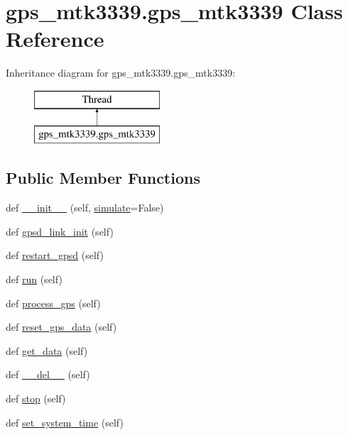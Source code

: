 \hypertarget{classgps__mtk3339_1_1gps__mtk3339}{}\section{gps\+\_\+mtk3339.\+gps\+\_\+mtk3339 Class Reference}
\label{classgps__mtk3339_1_1gps__mtk3339}
Inheritance diagram for gps\+\_\+mtk3339.\+gps\+\_\+mtk3339\+:\begin{figure}[H]
\begin{center}
\leavevmode
\includegraphics[height=2.000000cm]{classgps__mtk3339_1_1gps__mtk3339}
\end{center}
\end{figure}
\subsection*{Public Member Functions}
\begin{DoxyCompactItemize}
\item 
def \hyperlink{classgps__mtk3339_1_1gps__mtk3339_aef9ef03ebb7337c94b529d949fa494d4}{\+\_\+\+\_\+init\+\_\+\+\_\+} (self, \hyperlink{classgps__mtk3339_1_1gps__mtk3339_a0b660f851b889fd51697772bea5a2298}{simulate}=False)
\item 
def \hyperlink{classgps__mtk3339_1_1gps__mtk3339_a83e26207ff8028de5a6b07890e096ed0}{gpsd\+\_\+link\+\_\+init} (self)
\item 
def \hyperlink{classgps__mtk3339_1_1gps__mtk3339_a9866902bcd93e9087afc6b0a2a8eb579}{restart\+\_\+gpsd} (self)
\item 
def \hyperlink{classgps__mtk3339_1_1gps__mtk3339_a9d8c94a9453d19e4aa38d44b5b29d7a1}{run} (self)
\item 
def \hyperlink{classgps__mtk3339_1_1gps__mtk3339_a39164ba4a6f8f2456e2e6a0e8ce1cb43}{process\+\_\+gps} (self)
\item 
def \hyperlink{classgps__mtk3339_1_1gps__mtk3339_a5607ce090bf92bfae717d67b0052b5bd}{reset\+\_\+gps\+\_\+data} (self)
\item 
def \hyperlink{classgps__mtk3339_1_1gps__mtk3339_a393b083e3204be987c42bd9ba2d467b9}{get\+\_\+data} (self)
\item 
def \hyperlink{classgps__mtk3339_1_1gps__mtk3339_a5dc9478c99bcdc50e5584d202d141659}{\+\_\+\+\_\+del\+\_\+\+\_\+} (self)
\item 
def \hyperlink{classgps__mtk3339_1_1gps__mtk3339_ae2ed581bc519d827d6bcee53f5edd14a}{stop} (self)
\item 
def \hyperlink{classgps__mtk3339_1_1gps__mtk3339_ad86557ad5e6c12c8336e4eda66843f25}{set\+\_\+system\+\_\+time} (self)
\end{DoxyCompactItemize}
